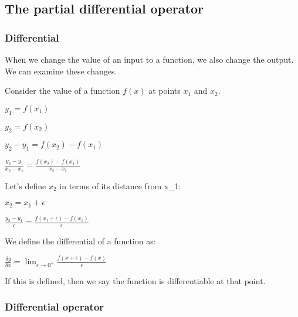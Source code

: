 
\subsection{The partial differential operator}

\subsubsection{Differential}

When we change the value of an input to a function, we also change the output. We can examine these changes.

Consider the value of a function \(f(x)\) at points \(x_1\) and \(x_2\).

$y_1=f(x_1)$

$y_2=f(x_2)$

$y_2-y_1=f(x_2)-f(x_1)$

$\frac{y_2-y_1}{x_2-x_1}=\frac{f(x_2)-f(x_1)}{x_2-x_1}$

Let's define \(x_2\) in terms of its distance from x_1:

$x_2=x_1+\epsilon$

$\frac{y_2-y_1}{\epsilon }=\frac{f(x_1+\epsilon )-f(x_1)}{\epsilon }$

We define the differential of a function as:

$\frac{\delta y}{\delta x}=\lim_{\epsilon \rightarrow 0^+}\frac{f(x+\epsilon )-f(x)}{\epsilon }$

If this is defined, then we say the function is differentiable at that point.

\subsubsection{Differential operator}

